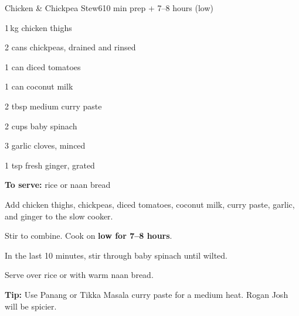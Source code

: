 \begin{recipebox}{Chicken \& Chickpea Stew}{6}{10 min prep + 7--8 hours (low)}
\begin{ingredients}
  \item 1\,kg chicken thighs
  \item 2 cans chickpeas, drained and rinsed
  \item 1 can diced tomatoes
  \item 1 can coconut milk
  \item 2 tbsp medium curry paste
  \item 2 cups baby spinach
  \item 3 garlic cloves, minced
  \item 1 tsp fresh ginger, grated
  \item \textbf{To serve:} rice or naan bread
\end{ingredients}

\begin{method}
  \item Add chicken thighs, chickpeas, diced tomatoes, coconut milk, curry paste, garlic, and ginger to the slow cooker.
  \item Stir to combine. Cook on \textbf{low for 7--8 hours}.
  \item In the last 10 minutes, stir through baby spinach until wilted.
  \item Serve over rice or with warm naan bread.
\end{method}

\begin{notelist}
  \item \textbf{Tip:} Use Panang or Tikka Masala curry paste for a medium heat. Rogan Josh will be spicier.
\end{notelist}
\end{recipebox}
